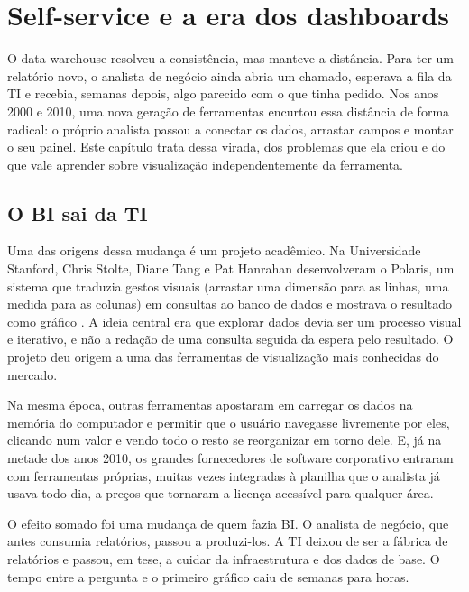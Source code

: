 \chapter{Self-service e a era dos dashboards}
\label{cap:self-service}

O data warehouse resolveu a consistência, mas manteve a distância. Para ter um relatório
novo, o analista de negócio ainda abria um chamado, esperava a fila da TI e recebia, semanas
depois, algo parecido com o que tinha pedido. Nos anos 2000 e 2010, uma nova geração de
ferramentas encurtou essa distância de forma radical: o próprio analista passou a
conectar os dados, arrastar campos e montar o seu painel. Este capítulo trata dessa
virada, dos problemas que ela criou e do que vale aprender sobre visualização
independentemente da ferramenta.

\section{O BI sai da TI}
\label{sec:bi-sai-da-ti}

Uma das origens dessa mudança é um projeto acadêmico. Na Universidade Stanford, Chris
Stolte, Diane Tang e Pat Hanrahan desenvolveram o Polaris, um sistema que traduzia
gestos visuais (arrastar uma dimensão para as linhas, uma medida para as colunas) em
consultas ao banco de dados e mostrava o resultado como gráfico
\parencite{stolte2002}. A ideia central era que explorar dados devia ser um processo
visual e iterativo, e não a redação de uma consulta seguida da espera pelo resultado. O
projeto deu origem a uma das ferramentas de visualização mais conhecidas do mercado.

Na mesma época, outras ferramentas apostaram em carregar os dados na memória do
computador e permitir que o usuário navegasse livremente por eles, clicando num valor e
vendo todo o resto se reorganizar em torno dele. E, já na metade dos anos 2010, os
grandes fornecedores de software corporativo entraram com ferramentas próprias, muitas
vezes integradas à planilha que o analista já usava todo dia, a preços que tornaram a
licença acessível para qualquer área.

O efeito somado foi uma mudança de quem fazia BI. O analista de negócio, que antes
consumia relatórios, passou a produzi-los. A TI deixou de ser a fábrica de relatórios e
passou, em tese, a cuidar da infraestrutura e dos dados de base. O tempo entre a
pergunta e o primeiro gráfico caiu de semanas para horas.

